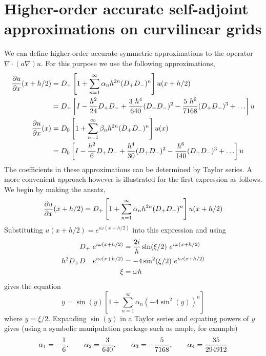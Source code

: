 \documentclass[10pt]{article}
\newcommand{\grad}{\nabla}
\begin{document}
\clearpage


\clearpage

\clearpage


\clearpage
\section{Higher-order accurate self-adjoint approximations on curvilinear grids}


We can define higher-order accurate symmetric approximations to the operator $\grad\cdot( a \grad)u$.
For this purpose we use the following approximations,
\begin{align*}
 {\partial u \over \partial x}(x+h/2) 
                        &= D_+\left[ 1 + \sum_{n=1}^{\infty}  \alpha_n h^{2n} (D_+D_-)^n \right] u(x+h/2) \\
                        &= D_+\left[ I - {h^2\over 24}D_+D_- + {3~h^4\over 640}(D_+D_-)^2 
                                                 - {5~h^6\over 7168}(D_+D_-)^3 +\ldots \right] u \\
 {\partial u \over \partial x}(x) 
                         &= D_0\left[ 1 + \sum_{n=1}^{\infty}  \beta_n h^{2n} (D_+D_-)^n \right] u(x) \\
                         &= D_0\left[ I - {h^2\over 6}D_+D_- + {h^4\over 30}(D_+D_-)^2 
                                                 - {h^6\over 140}(D_+D_-)^3 +\ldots \right] u \\ 
\end{align*}
The coefficients in these approximations can be determined by Taylor series. A more convenient approach however is
illustrated for the first expression as follows. We begin by making the ansatz,
\[
  {\partial u \over \partial x}(x+h/2) = D_+\left[ 1 + \sum_{n=1}^{\infty}  \alpha_n h^{2n} (D_+D_-)^n \right] u(x+h/2)
\]
Substituting $u(x+h/2)=e^{i\omega (x+h/2)}$ into this expression and using
\begin{align*}
  D_+ ~e^{i\omega (x+h/2)} &= {2 i\over h}  \sin(\xi/2)~e^{i\omega (x+h/2)} \\
  h^2 D_+D_- ~e^{i\omega (x+h/2)} &= - 4  \sin^2(\xi/2)~e^{i\omega (x+h/2)} \\
  \xi &= \omega h
\end{align*}
gives the equation
\[
    y = \sin(y) \left[ 1 + \sum_{n=1}^{\infty} \alpha_n (- 4 \sin^2(y))^n \right]
\]
where $y=\xi/2$. Expanding $\sin(y)$ in a Taylor series and
equating powers of $y$ gives (using a symbolic manipulation package such as maple, for example)
\[
  \alpha_1 = -{1\over6}, \qquad \alpha_2= {3\over 640} , \qquad \alpha_3= -{5\over 7168}, \qquad \alpha_4={35\over 294912}
\]
\end{document}
